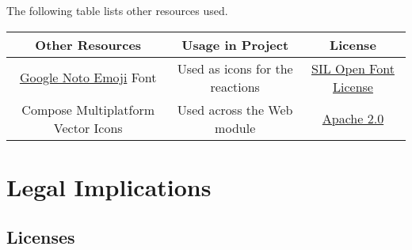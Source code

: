 \documentclass[a4paper]{article}
\begin{document}
    The following table lists other resources used.

    \vspace*{-1em}

    \begin{table}[H]
        \begin{tabular}{c|c|c}
            Other Resources & Usage in Project & License \\
            \hline
            \href{https://fonts.google.com/noto/specimen/Noto+Emoji}{Google Noto Emoji} Font & Used as icons for the reactions &
            \href{https://scripts.sil.org/cms/scripts/page.php?site_id=nrsi&id=OFL}{SIL Open Font License}
            \\
            Compose Multiplatform Vector Icons & Used across the Web module & \href{https://github.com/JetBrains/compose-multiplatform/blob/master/LICENSE.txt}{Apache 2.0} \\
        \end{tabular}
    \end{table}

    \vspace*{-1em}

    \section*{Legal Implications}

    \subsection*{Licenses}
\end{document}
